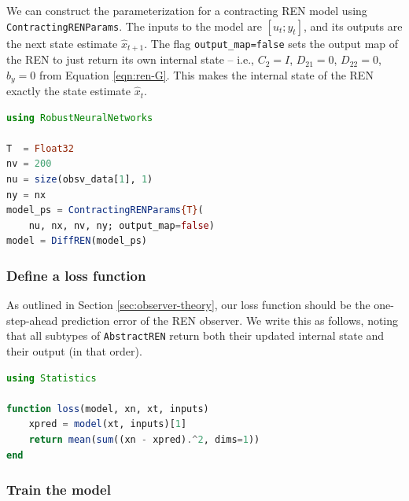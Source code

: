 We can construct the parameterization for a contracting REN model using \verb|ContractingRENParams|. The inputs to the model are $[u_t;y_t]$, and its outputs are the next state estimate $\hat{x}_{t+1}$. The flag \verb|output_map=false| sets the output map of the REN to just return its own internal state -- i.e., $C_2 = I$, $D_{21} = 0$, $D_{22} = 0$, $b_y = 0$ from Equation \ref{eqn:ren-G}. This makes the internal state of the REN exactly the state estimate $\hat{x}_t$.

\begin{lstlisting}[language = Julia]
using RobustNeuralNetworks

T  = Float32
nv = 200
nu = size(obsv_data[1], 1)
ny = nx
model_ps = ContractingRENParams{T}(
    nu, nx, nv, ny; output_map=false)
model = DiffREN(model_ps)
\end{lstlisting}

\subsubsection{Define a loss function} \label{sec:observer-loss}

As outlined in Section \ref{sec:observer-theory}, our loss function should be the one-step-ahead prediction error of the REN observer. We write this as follows, noting that all subtypes of \verb|AbstractREN| return both their updated internal state and their output (in that order).
\begin{lstlisting}[language = Julia]
using Statistics

function loss(model, xn, xt, inputs)
    xpred = model(xt, inputs)[1]
    return mean(sum((xn - xpred).^2, dims=1))
end
\end{lstlisting}

\subsubsection{Train the model} \label{sec:observer-train}

